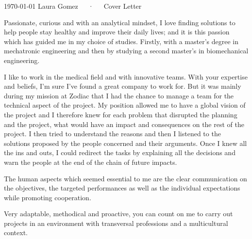 \documentclass[11pt, a4paper]{awesome-cv}
\begin{document}
\makecvheader[R]

\makecvfooter
  {\today}
  {Laura Gomez~~~·~~~Cover Letter}
  {}

\makelettertitle

\begin{cvletter}


Passionate, curious and with an analytical mindset, I love finding solutions to help people stay healthy and improve their daily lives;
and it is this passion which has guided me in my choice of studies. Firstly, with a master's degree in mechatronic engineering and then by studying a second master's in biomechanical engineering. 

I like to work in the medical field and with innovative teams. With your expertise and beliefs, I'm sure I've found a great company to work for.
%
But it was mainly during my mission at Zodiac that I had the chance to manage a team for the technical aspect of the project.
My position allowed me to have a global vision of the project and I therefore knew for each problem that disrupted the planning and the project, what would have an impact and consequences on the rest of the project.
I then tried to understand the reasons and then I listened to the solutions proposed by the people concerned and their arguments.
Once I knew all the ins and outs, I could redirect the tasks by explaining all the decisions and warn the people at the end of the chain of future impacts.

The human aspects which seemed essential to me are the clear communication on the objectives, the targeted performances as well as the individual expectations while promoting cooperation.

Very adaptable, methodical and proactive, you can count on me to carry out projects in an environment with transversal professions and a multicultural context.


\end{cvletter}
\end{document}

